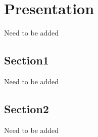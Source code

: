 \chapter{Presentation}
Need to be added
\section{Section1}
Need to be added
\section{Section2}
Need to be added

\FloatBarrier
\newpage